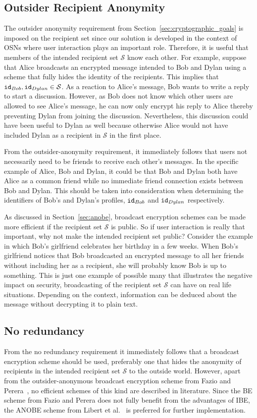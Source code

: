 \subsection{Outsider Recipient Anonymity}
The outsider anonymity requirement from Section~\ref{sec:cryptographic_goals} is imposed on the recipient set since our solution is developed in the context of OSNs where user interaction plays an important role. Therefore, it is useful that members of the intended recipient set $\mathcal{S}$ know each other. For example, suppose that Alice broadcasts an encrypted message intended to Bob and Dylan using a scheme that fully hides the identity of the recipients. This implies that $\mathtt{id}_{Bob}, \mathtt{id}_{Dylan} \in \mathcal{S}$. As a reaction to Alice's message, Bob wants to write a reply to start a discussion. However, as Bob does not know which other users are allowed to see Alice's message, he can now only encrypt his reply to Alice thereby preventing Dylan from joining the discussion. Nevertheless, this discussion could have been useful to Dylan as well because otherwise Alice would not have included Dylan as a recipient in $\mathcal{S}$ in the first place.

From the outsider-anonymity requirement, it immediately follows that users not necessarily need to be friends to receive each other's messages. In the specific example of Alice, Bob and Dylan, it could be that Bob and Dylan both have Alice as a common friend while no immediate friend connection exists between Bob and Dylan. This should be taken into consideration when determining the identifiers of Bob's and Dylan's profiles, $\mathtt{id}_{Bob}$ and $\mathtt{id}_{Dylan}$ respectively.

As discussed in Section~\ref{sec:anobe}, broadcast encryption schemes can be made more efficient if the recipient set $\mathcal{S}$ is public. So if user interaction is really that important, why not make the intended recipient set public? Consider the example in which Bob's girlfriend celebrates her birthday in a few weeks. When Bob's girlfriend notices that Bob broadcasted an encrypted message to all her friends without including her as a recipient, she will probably know Bob is up to something. This is just one example of possible many that illustrates the negative impact on security, broadcasting of the recipient set $\mathcal{S}$ can have on real life situations. Depending on the context, information can be deduced about the message without decrypting it to plain text.

\subsection{No redundancy}
From the no redundancy requirement it immediately follows that a broadcast encryption scheme should be used, preferably one that hides the anonymity of recipients in the intended recipient set $\mathcal{S}$ to the outside world. However, apart from the outsider-anonymous broadcast encryption scheme from Fazio and Perera~\cite{art:FazioP12}, no efficient schemes of this kind are described in literature. Since the BE scheme from Fazio and Perera does not fully benefit from the advantages of IBE, the ANOBE scheme from Libert et al.~\cite{art:LibertPQ12} is preferred for further implementation.

